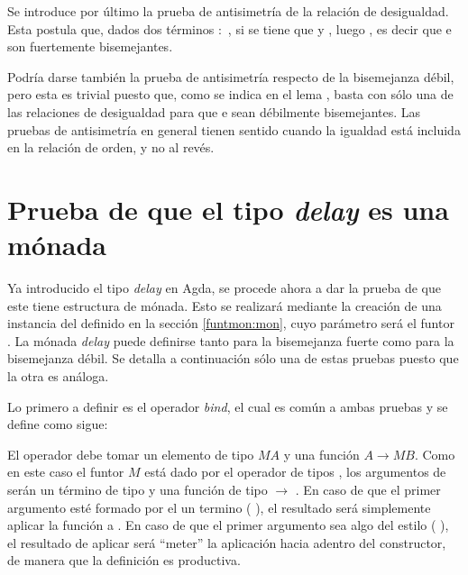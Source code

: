 Se introduce por último la prueba de antisimetría de la relación de desigualdad. Esta postula que, dados dos términos  $:$  \AgdaDatatype{$\bot$}, si se tiene que  \AgdaFunction{$\gtrsim$}  y  \AgdaFunction{$\lesssim$} , luego  \AgdaFunction{$\cong$} , es decir que  e  son fuertemente bisemejantes.


Podría darse también la prueba de antisimetría respecto de la bisemejanza débil, pero esta es trivial puesto que, como se indica en el lema \AgdaFunction{$\gtrsim\Rightarrow$}, basta con sólo una de las relaciones de desigualdad para que  e  sean débilmente bisemejantes. Las pruebas de antisimetría en general tienen sentido cuando la igualdad está incluida en la relación de orden, y no al revés.


\section{Prueba de que el tipo \textit{delay} es una mónada}

Ya introducido el tipo \textit{delay} en Agda, se procede ahora a dar la prueba de que este tiene estructura de mónada. Esto se realizará mediante la creación de una instancia del   definido en la sección \ref{funtmon:mon}, cuyo parámetro será el funtor \AgdaFunction{\_$\bot$}. La mónada \textit{delay} puede definirse tanto para la bisemejanza fuerte como para la bisemejanza débil. Se detalla a continuación sólo una de estas pruebas puesto que la otra es análoga. 

Lo primero a definir es el operador \textit{bind}, el cual es común a ambas pruebas y se define como sigue:


El operador  debe tomar un elemento de tipo $\mathit{M} A$ y una función $A \rightarrow \mathit{M} B$. Como en este caso el funtor $\mathit{M}$ está dado por el operador de tipos \AgdaDatatype{\_$\bot$}, los argumentos de  serán un término  de tipo  \AgdaDatatype{$\bot$} y una función  de tipo  $\rightarrow$  \AgdaDatatype{$\bot$}. En caso de que el primer argumento esté formado por el un termino ( ), el resultado será simplemente aplicar la función  a . En caso de que el primer argumento sea algo del estilo ( ), el resultado de aplicar  será ``meter'' la aplicación hacia adentro del constructor, de manera que la definición es productiva.

